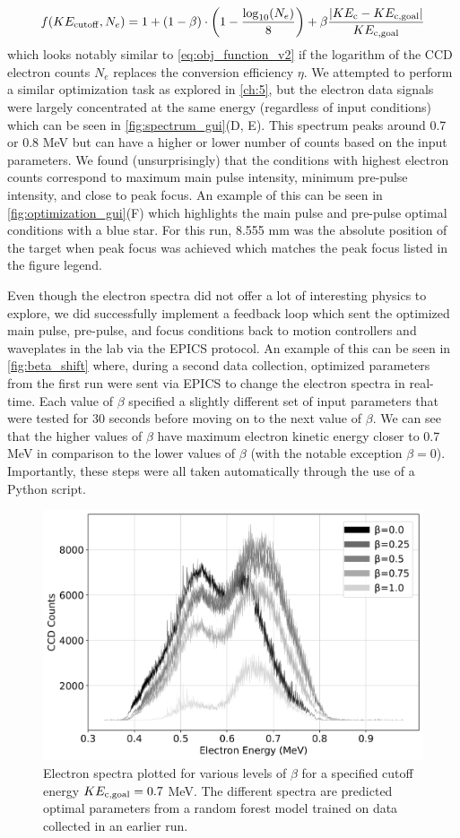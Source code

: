 \begin{equation}
	f(KE_{\rm cutoff},N_{e})  =  1 + (1 - \beta) \cdot \left(1 -  \frac{\log_{10}(N_{e})}{8} \right) + \beta \frac{|KE_{\rm c} - KE_{\rm c,goal}|}{KE_{\rm c, goal}} \label{eq:obj_function_daq}
\end{equation}
which looks notably similar to \autoref{eq:obj_function_v2} if the logarithm of the \gls{CCD} electron counts $N_e$ replaces the conversion efficiency $\eta$. We attempted to perform a similar optimization task as explored in \autoref{ch:5}, but the electron data signals were largely concentrated at the same energy (regardless of input conditions) which can be seen in \autoref{fig:spectrum_gui}(D, E). This spectrum peaks around 0.7 or 0.8 MeV but can have a higher or lower number of counts based on the input parameters. We found (unsurprisingly) that the conditions with highest electron counts correspond to maximum main pulse intensity, minimum pre-pulse intensity, and close to peak focus. An example of this can be seen in \autoref{fig:optimization_gui}(F) which highlights the main pulse and pre-pulse optimal conditions with a blue star. For this run, 8.555 mm was the absolute position of the target when peak focus was achieved which matches the peak focus listed in the figure legend.

Even though the electron spectra did not offer a lot of interesting physics to explore, we did successfully implement a feedback loop which sent the optimized main pulse, pre-pulse, and focus conditions back to motion controllers and waveplates in the lab via the \gls{EPICS} protocol. An example of this can be seen in \autoref{fig:beta_shift} where, during a second data collection, optimized parameters from the first run were sent via \gls{EPICS} to change the electron spectra in real-time. Each value of $\beta$ specified a slightly different set of input parameters that were tested for 30 seconds before moving on to the next value of $\beta$. We can see that the higher values of $\beta$ have maximum electron kinetic energy closer to 0.7 MeV in comparison to the lower values of $\beta$ (with the notable exception $\beta=0$). Importantly, these steps were all taken automatically through the use of a Python script.

\begin{figure}
	\centering 
	\includegraphics[width=0.6\linewidth]{planning/images/daq/rf_beta_shift.jpg}
	\caption{Electron spectra plotted for various levels of $\beta$ for a specified cutoff energy $KE_{\rm c,goal} = 0.7$ MeV. The different spectra are predicted optimal parameters from a random forest model trained on data collected in an earlier run.}
	\label{fig:beta_shift}
\end{figure}

